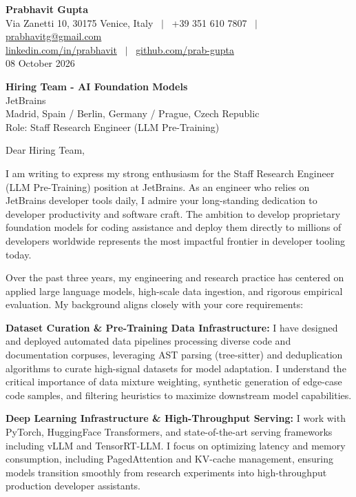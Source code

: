\documentclass[10.5pt,a4paper]{article}
\begin{document}
\textbf{\large Prabhavit Gupta}\\
Via Zanetti 10, 30175 Venice, Italy ~$\vert$~ +39 351 610 7807 ~$\vert$~ \href{mailto:prabhavitg@gmail.com}{prabhavitg@gmail.com}\\
\href{https://www.linkedin.com/in/prabhavit/}{linkedin.com/in/prabhavit} ~$\vert$~ \href{https://github.com/prab-gupta}{github.com/prab-gupta}\\
08 October 2026

\textbf{Hiring Team - AI Foundation Models}\\
JetBrains\\
Madrid, Spain / Berlin, Germany / Prague, Czech Republic\\
Role: Staff Research Engineer (LLM Pre-Training)

Dear Hiring Team,

I am writing to express my strong enthusiasm for the Staff Research Engineer (LLM Pre-Training) position at JetBrains. As an engineer who relies on JetBrains developer tools daily, I admire your long-standing dedication to developer productivity and software craft. The ambition to develop proprietary foundation models for coding assistance and deploy them directly to millions of developers worldwide represents the most impactful frontier in developer tooling today.

Over the past three years, my engineering and research practice has centered on applied large language models, high-scale data ingestion, and rigorous empirical evaluation. My background aligns closely with your core requirements:

\textbf{Dataset Curation \& Pre-Training Data Infrastructure:} I have designed and deployed automated data pipelines processing diverse code and documentation corpuses, leveraging AST parsing (tree-sitter) and deduplication algorithms to curate high-signal datasets for model adaptation. I understand the critical importance of data mixture weighting, synthetic generation of edge-case code samples, and filtering heuristics to maximize downstream model capabilities.

\textbf{Deep Learning Infrastructure \& High-Throughput Serving:} I work with PyTorch, HuggingFace Transformers, and state-of-the-art serving frameworks including vLLM and TensorRT-LLM. I focus on optimizing latency and memory consumption, including PagedAttention and KV-cache management, ensuring models transition smoothly from research experiments into high-throughput production developer assistants.
\end{document}
